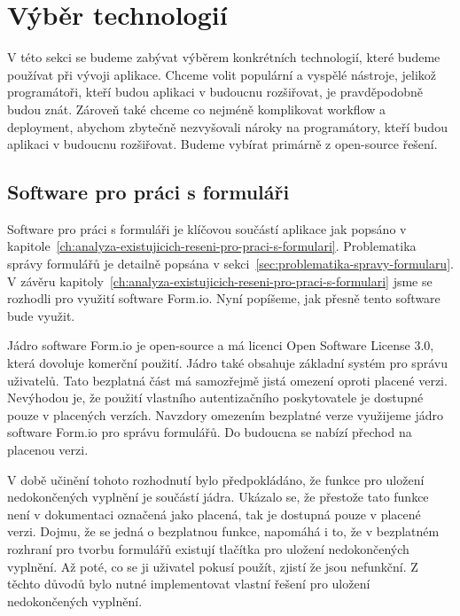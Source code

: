 \section{Výběr technologií}\label{sec:vyber-technologii}

V této sekci se budeme zabývat výběrem konkrétních technologií, které budeme používat při vývoji aplikace.
Chceme volit populární a vyspělé nástroje, jelikož programátoři, kteří budou aplikaci v budoucnu rozšiřovat, je pravděpodobně budou znát.
Zároveň také chceme co nejméně komplikovat workflow a deployment, abychom zbytečně nezvyšovali nároky na programátory, kteří budou aplikaci v budoucnu rozšiřovat.
Budeme vybírat primárně z open-source řešení.

\subsection{Software pro práci s formuláři}\label{subsec:software-pro-praci-s-formulari}

Software pro práci s formuláři je klíčovou součástí aplikace jak popsáno v kapitole~\ref{ch:analyza-existujicich-reseni-pro-praci-s-formulari}.
Problematika správy formulářů je detailně popsána v sekci~\ref{sec:problematika-spravy-formularu}.
V závěru kapitoly~\ref{ch:analyza-existujicich-reseni-pro-praci-s-formulari} jsme se rozhodli pro využití software Form.io.
Nyní popíšeme, jak přesně tento software bude využit.

Jádro software Form.io je open-source a má licenci Open Software License 3.0, která dovoluje komerční použití.
Jádro také obsahuje základní systém pro správu uživatelů.
Tato bezplatná část má samozřejmě jistá omezení oproti placené verzi.
Nevýhodou je, že použití vlastního autentizačního poskytovatele je dostupné pouze v placených verzích.
Navzdory omezením bezplatné verze využijeme jádro software Form.io pro správu formulářů.
Do budoucna se nabízí přechod na placenou verzi.

V době učinění tohoto rozhodnutí bylo předpokládáno, že funkce pro uložení nedokončených vyplnění je součástí jádra.
Ukázalo se, že přestože tato funkce není v dokumentaci označená jako placená, tak je dostupná pouze v placené verzi.
Dojmu, že se jedná o bezplatnou funkce, napomáhá i to, že v bezplatném rozhraní pro tvorbu formulářů existují tlačítka pro uložení nedokončených vyplnění.
Až poté, co se ji uživatel pokusí použít, zjistí že jsou nefunkční.
Z těchto důvodů bylo nutné implementovat vlastní řešení pro uložení nedokončených vyplnění.

